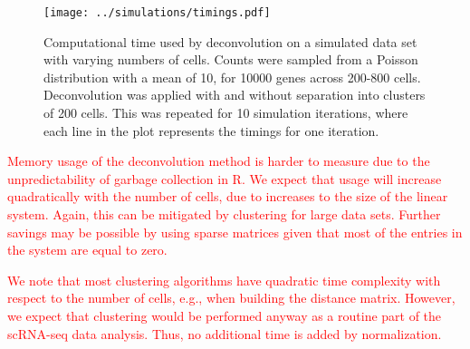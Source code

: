 \documentclass{article}
\newcommand\revised[1]{\textcolor{red}{#1}}
\begin{document}
\begin{figure}[btp]
    \begin{center}
        \texttt{[image: ../simulations/timings.pdf]}
    \end{center}
    \caption{
        Computational time used by deconvolution on a simulated data set with varying numbers of cells.
        Counts were sampled from a Poisson distribution with a mean of 10, for 10000 genes across 200-800 cells.
        Deconvolution was applied with and without separation into clusters of 200 cells.
        This was repeated for 10 simulation iterations, where each line in the plot represents the timings for one iteration.
    }
    \label{fig:timings}
\end{figure}

\revised{Memory usage of the deconvolution method is harder to measure due to the unpredictability of garbage collection in R.
We expect that usage will increase quadratically with the number of cells, due to increases to the size of the linear system.
Again, this can be mitigated by clustering for large data sets.
Further savings may be possible by using sparse matrices given that most of the entries in the system are equal to zero.}

\revised{We note that most clustering algorithms have quadratic time complexity with respect to the number of cells, e.g., when building the distance matrix.
However, we expect that clustering would be performed anyway as a routine part of the scRNA-seq data analysis.
Thus, no additional time is added by normalization.}
\end{document}
